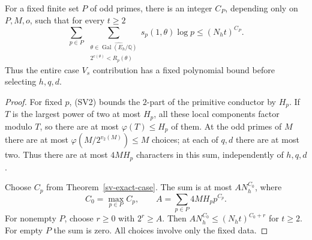\begin{corollary}\label{sv-summed}
For a fixed finite set $P$ of odd primes, there is an integer
$C_P$, depending only on $P,M,o$, such that for every $t\ge2$
\[
 \sum_{p\in P}\ \sum_{\substack{\theta\in
          \widehat{\operatorname{Gal}(E_h/\mathbb Q)}\\2^{c(\theta)}<R_p(\theta)}}
                   s_p(1,\theta)\log p\le(N_ht)^{C_P}.
                                                               \tag{SV9}
\]
Thus the entire case $V_s$ contribution has a fixed polynomial
bound before selecting $h,q,d$.
\end{corollary}
\begin{proof}
For fixed $p$, (SV2) bounds the $2$-part of the primitive
conductor by $H_p$. If $T$ is the largest power of two at most
$H_p$, all these local components factor modulo $T$, so there
are at most $\varphi(T)\le H_p$ of them. At the odd primes
of $M$ there are at most $\varphi(M/2^{v_2(M)})\le M$
choices; at each of $q,d$ there are at most two. Thus there
are at most $4MH_p$ characters in this sum, independently of
$h,q,d$.

Choose $C_p$ from Theorem~\ref{sv-exact-case}. The sum is at
most $A N_h^{C_0}$, where
\[
 C_0=\max_{p\in P}C_p,\qquad
 A=\sum_{p\in P}4MH_p p^{C_p}.
\]
For nonempty $P$, choose $r\ge0$ with $2^r\ge A$.
Then $A N_h^{C_0}\le(N_ht)^{C_0+r}$ for $t\ge2$.
For empty $P$ the sum is zero. All choices involve only the
fixed data.
\end{proof}


